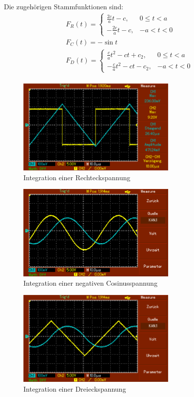 Die zugehörigen Stammfunktionen sind:
\begin{align}
	&F_R(t) = \begin{cases}
		\frac{2c}{a} t - c, & 0\leq t < a \\
		-\frac{2c}{a} t - c, & -a < t < 0
	\end{cases} \\
	&F_C(t) = -\sin{t} \\
	&F_D(t) = \begin{cases}
		\frac{c}{a} t^2-ct + c_2, & 0\leq t < a \\
		-\frac{c}{a} t^2-ct - c_2, & -a < t < 0
	\end{cases} \\
\end{align}


\begin{figure}[h!]
	\centering
	\includegraphics[width=0.7\textwidth]{MAP002.png}
	\caption{Integration einer Rechteckspannung}
	\label{fig:integral1}
\end{figure} 

\begin{figure}[h!]
	\centering
	\includegraphics[width=0.7\textwidth]{MAP003.png}
	\caption{Integration einer negativen Cosinusspannung}
	\label{fig:integral2}
\end{figure} 

\begin{figure}[h!]
	\centering
	\includegraphics[width=0.7\textwidth]{MAP004.png}
	\caption{Integration einer Dreieckspannung}
	\label{fig:integral3}
\end{figure} 






	
